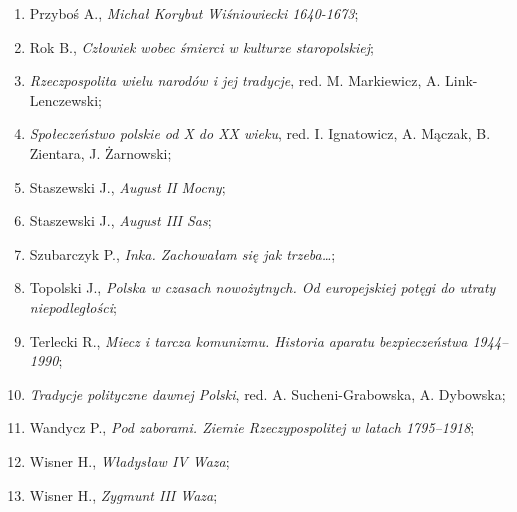 \documentclass[a4paper,11pt]{article}
\begin{document}
\begin{enumerate}
\item Przyboś A., \textit{Michał Korybut Wiśniowiecki 1640-1673};



\item Rok B., \textit{Człowiek wobec śmierci w kulturze staropolskiej};



\item \textit{Rzeczpospolita wielu narodów i jej tradycje}, red. M.
  Markiewicz, A. Link-Lenczewski;



\item \textit{Społeczeństwo polskie od X do XX wieku}, red. I.
  Ignatowicz, A. Mączak, B. Zientara, J. Żarnowski;



\item Staszewski J., \textit{August II Mocny};



\item Staszewski J., \textit{August III Sas};



\item Szubarczyk P., \textit{Inka. Zachowałam się jak trzeba\ldots};



\item Topolski J., \textit{Polska w czasach nowożytnych. Od europejskiej
    potęgi do utraty niepodległości};



\item Terlecki R., \textit{Miecz i tarcza komunizmu. Historia aparatu
    bezpieczeństwa 1944--1990};



\item \textit{Tradycje polityczne dawnej Polski}, red. A.
  Sucheni-Grabowska, A. Dybowska;



\item Wandycz P., \textit{Pod zaborami. Ziemie Rzeczypospolitej w latach
    1795--1918};



\item Wisner H., \textit{Władysław IV Waza};



\item Wisner H., \textit{Zygmunt III Waza};




\end{enumerate}
\end{document}
